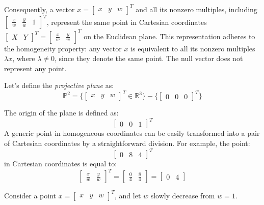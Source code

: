 \documentclass[12pt, a4paper]{report}
\begin{document}
    Consequently, a vector $x = {\begin{bmatrix} x & y & w \end{bmatrix}}^T$ and all its nonzero multiples, including ${\begin{bmatrix} \frac{x}{w} & \frac{y}{w} & 1 \end{bmatrix}}^T$, represent the same point in Cartesian coordinates ${\begin{bmatrix} X & Y \end{bmatrix}}^T={\begin{bmatrix}  \frac{x}{w} &  \frac{y}{w} \end{bmatrix}}^T$ on the Euclidean plane. 
    This representation adheres to the homogeneity property: any vector $x$ is equivalent to all its nonzero multiples $\lambda x$, where $\lambda \neq 0$, since they denote the same point.
    The null vector does not represent any point.
    \newpage
    \begin{definition}
        Let's define the \emph{projective plane} as:
        \[\mathbb{P}^2=\{{\begin{bmatrix} x & y & w \end{bmatrix}}^T \in \mathbb{R}^3\}-\{{\begin{bmatrix} 0 & 0 & 0 \end{bmatrix}}^T\}\]
    \end{definition}
    \begin{example}
        The origin of the plane is defined as:
        \[{\begin{bmatrix} 0 & 0 & 1 \end{bmatrix}}^T\]
        A generic point in homogeneous coordinates can be easily transformed into a pair of Cartesian coordinates by a straightforward division. 
        For example, the point:
        \[{\begin{bmatrix} 0 & 8 & 4 \end{bmatrix}}^T\]
        in Cartesian coordinates is equal to:
        \[{\begin{bmatrix} \frac{x}{w} & \frac{y}{w} \end{bmatrix}}^T=\begin{bmatrix} \frac{0}{4} & \frac{8}{4} \end{bmatrix}=\begin{bmatrix} 0 & 4 \end{bmatrix}\]
    \end{example}
    Consider a point $x={\begin{bmatrix} x & y & w \end{bmatrix}}^T$, and let $w$ slowly decrease from $w=1$. 
\end{document}
